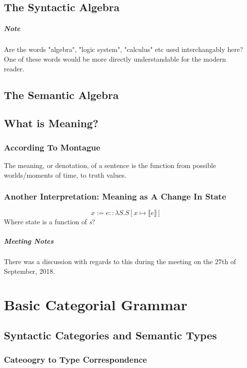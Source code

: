\documentclass[letterpaper,12pt]{article}
\begin{document}
\subsection{The Syntactic Algebra}

\subparagraph{Note}
Are the words "algebra", "logic system", "calculus" etc used interchangably here? One of these words would be more directly understandable for the modern reader.

\subsection{The Semantic Algebra}

\subsection{What is Meaning?}

\subsubsection{According To Montague}

The meaning, or denotation, of a sentence is the function from possible worlds/moments of time, to truth values.

\subsubsection{Another Interpretation: Meaning as A Change In State}

\begin{equation}
x := e  ::  \lambda S . S [ x \mapsto \llbracket e \rrbracket ]
\end{equation}
 Where state is a function of \textit{s}?

\subparagraph{Meeting Notes}
There was a discussion with regards to this during the meeting on the 27th of September, 2018. 

\section{Basic Categorial Grammar}

\subsection{Syntactic Categories and Semantic Types}

\subsubsection{Cateoogry to Type Correspondence}
\end{document}

